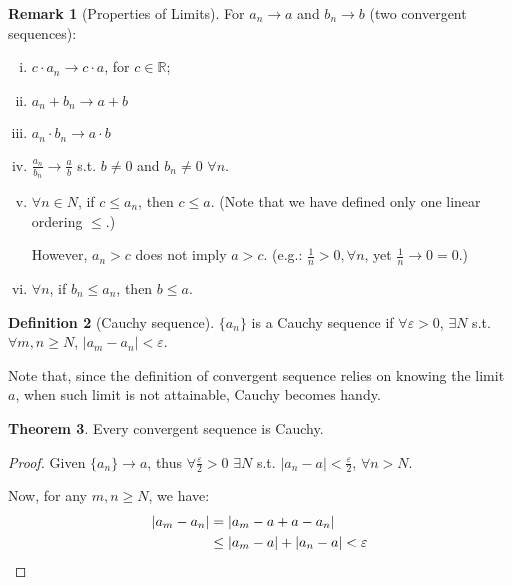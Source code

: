 \documentclass[12pt]{article}
\newcommand{\R}{{\mathbb R}}
\theoremstyle{definition}
\newtheorem{theorem}{Theorem}[section]
\newtheorem{definition}[theorem]{Definition}
\newtheorem{remark}[theorem]{Remark}
\theoremstyle{plain}
\begin{document}
\begin{remark}
    [Properties of Limits]
    For $a_n \to a$ and $b_n \to b$ (two convergent sequences):
    \begin{enumerate}[(i)]
        \item $c \cdot a_n \to c\cdot a$, for $c \in \R$;
        \item $a_n + b_n \to a + b$
        \item $a_n \cdot b_n \to a\cdot b$
        \item $\frac{a_n}{b_n} \to \frac{a}{b}$ s.t. $b \not = 0$ and $b_n \not= 
            0$ $\forall n$.
        \item $\forall n \in N$, if  $c \le a_n$, then $c \le a$. (Note that we have 
            defined only one linear ordering $\le$.)

            However, $a_n > c$ does not imply $a > c$. (e.g.: 
            $\frac{1}{n} > 0, \forall n$, yet $\frac{1}{n}\to 0 = 0$.)

        \item $\forall n$, if $b_n \le a_n$, then $b\le a$.
    \end{enumerate}    
\end{remark}

\begin{definition}
    [Cauchy sequence]

    $\{a_n\}$ is a Cauchy sequence if $\forall \varepsilon> 0$, $\exists N$ s.t. 
    $\forall m , n \ge N$, $|a_m-a_n| < \varepsilon$.
\end{definition}

Note that, since the definition of convergent sequence relies on knowing the 
limit $a$, when such limit is not attainable, Cauchy becomes handy.

\begin{theorem}
    \label{thm_convergent_is_Cauchy}
    Every convergent sequence is Cauchy.
    \begin{proof}
        Given $\{a _n\} \to a$, thus $\forall \frac{\varepsilon}{2} > 
        0$ $\exists N$ s.t. $|a_n - a| < \frac{\varepsilon}{2}$, $\forall n > 
        N$.

        Now, for any $m, n \ge N$, we have: 
        \[
            \aligned
            |a_m - a_n| & = | a_m - a + a - a_n|\\
            & \le |a_m - a| + |a_n - a| < \varepsilon
            \endaligned
        \]
    \end{proof}
\end{theorem}
\end{document}
